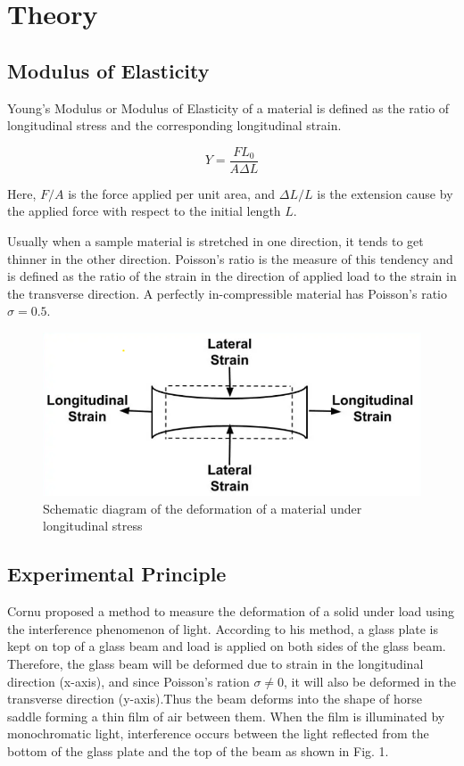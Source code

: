 \section{Theory}
\subsection{Modulus of Elasticity}

Young's Modulus or Modulus of Elasticity of a material is defined as the ratio of longitudinal stress and the corresponding longitudinal strain.

\begin{equation}
    Y = \frac{FL_0}{A\Delta L}
\end{equation}

Here, $F/A$ is the force applied per unit area, and $\Delta L/L$ is the extension cause by the applied force with respect to the initial length $L$.

Usually when a sample material is stretched in one direction, it tends to get thinner in the other direction. Poisson's ratio is the measure of this tendency and is defined as the ratio of the strain in the direction of applied load to the strain in the transverse direction. A perfectly in-compressible material has Poisson’s ratio $\sigma = 0.5$.

\begin{figure}[H]
    \centering
    \label{fig:3}
    \includegraphics[width=0.8\columnwidth]{images/f2.png}
    \caption{Schematic diagram of the deformation of a material under longitudinal stress}
\end{figure}

\subsection{Experimental Principle}
Cornu proposed a method to measure the deformation of a solid under load using the interference phenomenon of light. According to his method, a glass plate is kept on top of a glass beam and load is applied on both sides of the glass beam. Therefore, the glass beam will be deformed due to strain in the longitudinal direction (x-axis), and since Poisson's ration $\sigma \ne 0$, it will also be deformed in the transverse direction (y-axis).Thus the beam deforms into the shape of horse saddle forming a thin film of air between them. When the film is illuminated by monochromatic light, interference occurs between the light reflected from the bottom of the glass plate and the top of the beam as shown in Fig. 1.

